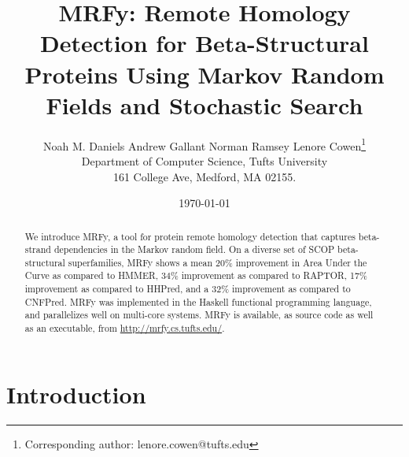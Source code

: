 \documentclass{acm_proc_article-sp}
\begin{document}
\title{MRFy: Remote Homology Detection for Beta-Structural Proteins
  Using Markov Random Fields and Stochastic Search}

\author{Noah M. Daniels \hspace*{8pt} Andrew Gallant \hspace*{8pt} Norman 
Ramsey \hspace*{8pt} 
Lenore Cowen\thanks{Corresponding author: lenore.cowen@tufts.edu}
\\ Department of Computer Science, Tufts University \\ 161 College Ave, 
Medford, MA 02155.}

\date{\today}

\maketitle




\begin{abstract}

We introduce MRFy, a tool for protein remote homology detection that captures
beta-strand dependencies in the Markov random field.
On a diverse set of SCOP beta-structural superfamilies, MRFy shows a mean 20\%
improvement in Area Under the Curve as compared to HMMER, 34\% improvement as
compared to RAPTOR, 17\% improvement as compared to HHPred, and a 32\% 
improvement as compared to CNFPred.
MRFy was implemented in the Haskell functional programming language, and
parallelizes well on multi-core systems.
MRFy is available, as source code as well as an executable, from
\url{http://mrfy.cs.tufts.edu/}.

\end{abstract} 




\section{Introduction}
\end{document}
